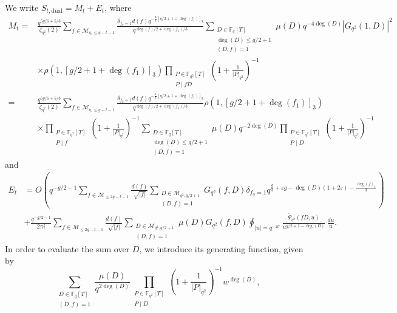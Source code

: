 \documentclass[table]{amsart}
\newcommand{\F}{\mathbb{F}}
\newcommand{\cM}{\mathcal{M}}
\numberwithin{equation}{section}
\begin{document}
\noindent We write $S_{t, \text{dual}}=M_t+E_t$, where 
\begin{align*}
M_t= & \frac{q^{5g/6+5/3}}{\zeta_{q^2}(2)} \sum_{f \in \mathcal{M}_{q,\leq g-t-1}} \frac{\delta_{f_2=1} d(f)q^{- \frac{8}{3} [g/2+1+ \deg(f_1)]_3}}{q^{\deg(f)/2+\deg(f_1)/3}} \sum_{\substack{D \in \F_q[T]\\ \deg(D) \leq g/2 + 1\\(D,f)=1}} \mu(D)     q^{-4\deg(D)}
|G_{q^2}(1,D)|^2\\
&\times \rho(1, [g/2+1+\deg(f_1)]_3)\prod_{\substack {P \in \F_{q^2}[T] \\ P\mid fD}} \left (1+ \frac{1}{|P|_{q^2}} \right )^{-1} \\
=& \frac{q^{5g/6+5/3}}{\zeta_{q^2}(2)} \sum_{f \in \mathcal{M}_{q,\leq g-t-1}} \frac{\delta_{f_2=1}d(f)q^{- \frac{8}{3} [g/2+1+\deg(f_1)]_3}}{q^{\deg(f)/2+\deg(f_1)/3}} 
\rho(1, [g/2+1+ \deg(f_1)]_3)\\
&\times \prod_{\substack {P \in \F_{q^2}[T] \\P\mid f}} \left (1+ \frac{1}{|P|_{q^2}} \right )^{-1} \sum_{\substack{D \in \F_q[T]\\ \deg(D) \leq g/2 + 1\\(D,f)=1}} \mu(D)q^{-2\deg(D)}
\prod_{\substack {P \in \F_{q^2}[T] \\P\mid D}} \left (1+ \frac{1}{|P|_{q^2}} \right )^{-1}
\end{align*}
and
 \begin{equation}\label{dual error}
    \begin{split}
    E_t&=O\left(q^{-g/2-1}\sum_{f\in \cM_{\leq 2g-t-1}}  \frac{d(f)}{\sqrt{|f|}}\sum_{\substack{D \in \mathcal{M}_{q^{2}, g / 2+1} \\(D,f)=1}} G_{q^2}(f,D)\delta_{f_2=1}q^{\frac{g}{3}+\varepsilon g-\deg(D)(1+2\varepsilon)-\frac{\deg(f)_1}{3}} \right)\\&+\frac{q^{-g/2-1}}{2 \pi i}\sum_{f\in \cM_{\leq 2g-t-1}}  \frac{d(f)}{\sqrt{|f|}}\sum_{\substack{D \in \mathcal{M}_{q^{2}, g / 2+1} \\(D,f)=1}}\mu(D) G_{q^2}(f,D)  \oint_{|u|=q^{-2\sigma}} \frac{ \tilde{\Psi}_{q^2}(fD,u)}{u^{g/2+1-\deg(D)}} \, \frac{du}{u}.
    \end{split}
\end{equation}
\noindent In order to evaluate the sum over \( D \), we introduce its generating function, given by  
\[
\sum_{\substack{D \in \mathbb{F}_q[T] \\ (D,f)=1}}  \frac{ \mu(D)}{q^{2 \deg(D)}} \prod_{\substack{P \in \mathbb{F}_{q^2}[T] \\ P\mid D}} \left ( 1+ \frac{1}{|P|_{q^2}} \right )^{-1} w^{\deg(D)},
\]
\end{document}
